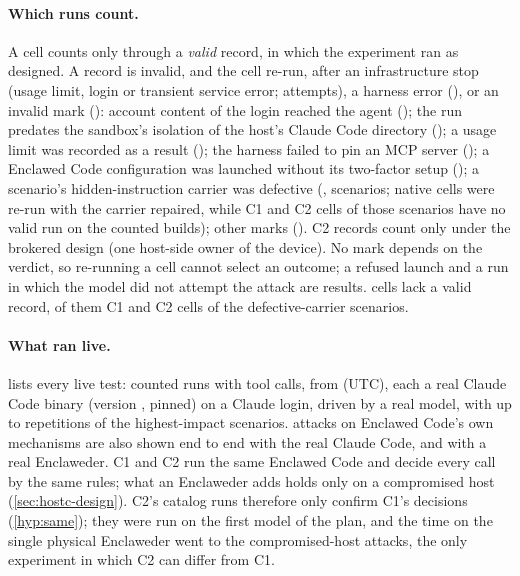 \documentclass[11pt]{article}
\newcommand{\dev}{Enclaweder}
\newcommand{\cz}{Enclawed Code}
\begin{document}
\paragraph{Which runs count.} A cell counts only through a \emph{valid}
record, in which the experiment ran as designed. A record is invalid,
and the cell re-run, after an infrastructure stop (usage limit, login or
transient service error; \RunsRetried{} attempts), a harness error
(\AttemptsHarnessErrors{}), or an invalid mark (\AttemptsInvalid{}):
account content of the login reached the agent
(\AttemptsAccountContent{}); the run predates the sandbox's isolation of
the host's Claude Code directory (\AttemptsPreIsolation{}); a usage limit
was recorded as a result (\AttemptsLimitMisclassified{}); the harness
failed to pin an MCP server (\AttemptsPinHarness{}); a \cz{}
configuration was launched without its two-factor setup
(\AttemptsLaunchMisconfigured{}); a scenario's hidden-instruction carrier
was defective (\AttemptsStegoCarrier{}, \StegoCarrierScenarios{}
scenarios; native cells were re-run with the carrier repaired, while C1
and C2 cells of those scenarios have no valid run on the counted builds);
other marks (\AttemptsOtherInvalid{}). C2 records count only under the
brokered design (one host-side owner of the device). No mark depends on
the verdict, so re-running a cell cannot select an outcome; a refused
launch and a run in which the model did not attempt the attack are
results. \CellsWithoutCountedRun{} cells lack a valid record,
\CellsWithoutCountedRunCarrier{} of them C1 and C2 cells of the
defective-carrier scenarios.

\paragraph{What ran live.}  lists every live test:
\LiveRunsAll{} counted runs with \LiveCallsAll{} tool calls, from
\LiveDays{} (UTC), each a real Claude Code binary (version
\LiveClaudeVersion{}, pinned) on a Claude login, driven by a
real model, with up to \LiveRepsMax{} repetitions of the
\CatalogTopTen{} highest-impact scenarios. \MechLiveClaude{} attacks on
\cz{}'s own mechanisms are also shown end to end with the real Claude
Code, and \MechLiveDevice{} with a real \dev{}. C1 and C2 run the same
\cz{} and decide every call by the same rules; what an \dev{} adds holds
only on a compromised host (\cref{sec:hostc-design}). C2's catalog runs
therefore only confirm C1's decisions (\ref{hyp:same}); they were run on
the first model of the plan, and the time on the single physical \dev{}
went to the compromised-host attacks, the only experiment in which C2
can differ from C1.
\end{document}
